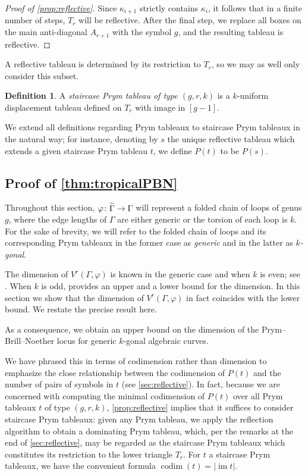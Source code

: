 \documentclass[11pt,reqno]{amsart}
\newcommand*{\abs}[1]{{\lvert #1 \rvert}}
\newcommand*{\maps}{\nobreak\mskip2mu\mathpunct{}\nonscript
  \mkern-\thinmuskip{:}\mskip6muplus1mu\relax}
\newcommand*{\card}[1]{\abs{#1}}
\newcommand*{\wti}[1]{\widetilde{#1}}
\DeclareMathOperator{\im}{im}
\DeclareMathOperator{\codim}{codim}
\theoremstyle{definition}
\newtheorem{definition}{Definition}[section]
\theoremstyle{problem}
\theoremstyle{plain}
\theoremstyle{remark}
\theoremstyle{theorem}
\numberwithin{equation}{section}
\numberwithin{figure}{section}
\begin{document}
\begin{proof}[Proof of \cref{prop:reflective}]
  Since $\kappa_{i+1}$ strictly contains $\kappa_{i}$, it follows that
  in a finite number of steps, $T_r$ will be reflective.  After the
  final step, we replace all boxes on the main anti-diagonal $A_{r+1}$
  with the symbol $g$, and the resulting tableau is reflective.
\end{proof}

A reflective tableau is determined by its restriction to
$T_r$, so we may as well only consider this subset. 

\begin{definition}
  A \textit{staircase Prym tableau of type $(g,r,k)$} is a $k$-uniform
  displacement tableau defined on $T_r$ with image in $[g-1]$.
\end{definition}
We extend all definitions regarding Prym tableaux to staircase Prym
tableaux in the natural way; for instance, denoting by $s$ the unique
reflective tableau which extends a given staircase Prym tableau $t$,
we define $P(t)$ to be $P(s)$.

\subsection{Proof of
  \cref{thm:tropicalPBN}}\label{sec:tropical-dim-proof}

Throughout this section, $\varphi\maps\wti\Gamma\to\Gamma$ will
represent a folded chain of loops of genus $g$, where the edge lengths
of $\Gamma$ are either generic or the torsion of each loop is $k$. For
the sake of brevity, we will refer to the folded chain of loops and
its corresponding Prym tableaux in the former case as \emph{generic}
and in the latter as \textit{$k$-gonal}.

The dimension of $V^r(\Gamma,\varphi)$ is known in the generic case
and when $k$ is even; see \cite[Theorem~6.1.4,
Corollary~6.2.2]{len2019skeletons}.  When $k$ is odd,
\cite[Remark~6.2.3]{len2019skeletons} provides an upper and a lower
bound for the dimension. In this section we show that the dimension of
$V^r(\Gamma, \varphi)$ in fact coincides with the lower bound.  We
restate the precise result here.

\tropicalPBN*

\noindent As a consequence, we obtain an upper bound on the dimension
of the Prym--Brill--Noether locus for generic $k$-gonal algebraic
curves.

We have phrased this in terms of codimension rather than dimension to
emphasize the close relationship between the codimension of $P(t)$ and
the number of pairs of symbols in $t$ (see \cref{sec:reflective}).  In
fact, because we are concerned with computing the minimal codimension
of $P(t)$ over all Prym tableaux $t$ of type $(g,r,k)$,
\cref{prop:reflective} implies that it suffices to consider staircase
Prym tableaux: given any Prym tableau, we apply the reflection
algorithm to obtain a dominating Prym tableau, which, per the remarks
at the end of \cref{sec:reflective}, may be regarded as the staircase
Prym tableaux which constitutes its restriction to the lower triangle
$T_r$.  For $t$ a staircase Prym tableaux, we have the convenient
formula $\codim(t) = \card{\im t}$.
\end{document}
